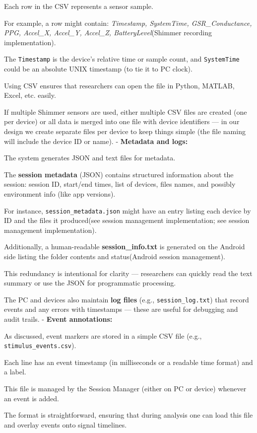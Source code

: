 Each row in the CSV represents a sensor sample.

For example, a row might contain: \textit{Timestamp, SystemTime, GSR_Conductance, PPG, Accel_X, Accel_Y, Accel_Z, BatteryLevel}(Shimmer recording implementation).

The \texttt{Timestamp} is the device's relative time or sample count, and \texttt{SystemTime} could be an absolute UNIX timestamp (to tie it to PC clock).

Using CSV ensures that researchers can open the file in Python, MATLAB, Excel, etc. easily.

If multiple Shimmer sensors are used, either multiple CSV files are created (one per device) or all data is merged into one file with device identifiers --- in our design we create separate files per device to keep things simple (the file naming will include the device ID or name). - \textbf{Metadata and logs:}

The system generates JSON and text files for metadata.

The \textbf{session metadata}
 (JSON) contains structured information about the session: session ID, start/end times, list of devices, files names, and possibly environment info (like app versions).

For instance, \texttt{session\_metadata.json} might have an entry listing each device by ID and the files it produced(see session management implementation; see session management implementation).

Additionally, a human-readable \textbf{session_info.txt}
 is generated on the Android side listing the folder contents and status(Android session management).

This redundancy is intentional for clarity --- researchers can quickly read the text summary or use the JSON for programmatic processing.

The PC and devices also maintain \textbf{log files}
 (e.g., \texttt{session\_log.txt}) that record events and any errors with timestamps --- these are useful for debugging and audit trails. - \textbf{Event annotations:}

As discussed, event markers are stored in a simple CSV file (e.g., \texttt{stimulus\_events.csv}).

Each line has an event timestamp (in milliseconds or a readable time format) and a label.

This file is managed by the Session Manager (either on PC or device) whenever an event is added.

The format is straightforward, ensuring that during analysis one can load this file and overlay events onto signal timelines.

